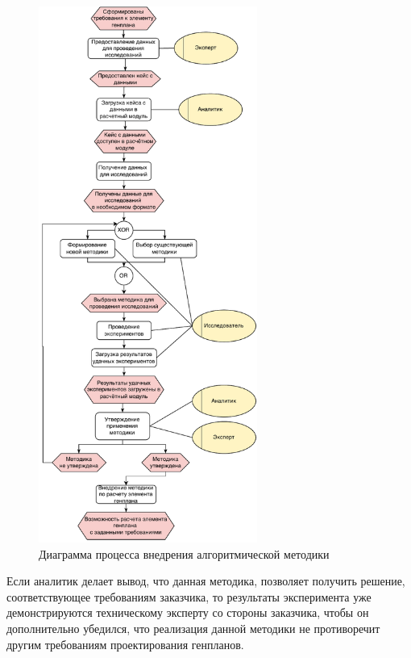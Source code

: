 \begin{figure}[H]
	\hspace*{2 cm}
	\includegraphics[width=0.64\textwidth, left]{analysis/pictures/usecases/common_epc}
	\caption{Диаграмма процесса внедрения алгоритмической методики}
	\label{pic:analysis__usecases-epc}
\end{figure}

Если аналитик делает вывод, что данная методика, позволяет получить решение, соответствующее требованиям
заказчика, то результаты эксперимента уже демонстрируются техническому эксперту со стороны заказчика,
чтобы он дополнительно убедился, что реализация данной методики не противоречит другим требованиям
проектирования генпланов.

